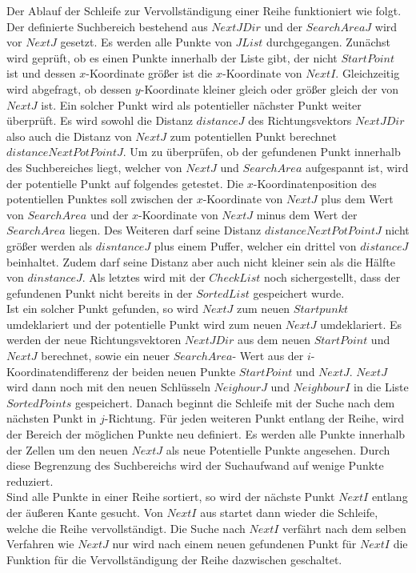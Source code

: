 Der Ablauf der Schleife zur Vervollständigung einer Reihe funktioniert wie folgt. Der definierte Suchbereich bestehend aus $NextJDir$ und der $SearchAreaJ$ wird vor $NextJ$ gesetzt. Es werden alle Punkte von $JList$ durchgegangen. Zunächst wird geprüft, ob es einen Punkte innerhalb der Liste gibt, der nicht $StartPoint$ ist und dessen $x$-Koordinate größer ist die $x$-Koordinate von $NextI$. Gleichzeitig wird abgefragt, ob dessen $y$-Koordinate kleiner gleich oder größer gleich der von $NextJ$ ist. Ein solcher Punkt wird als potentieller nächster Punkt weiter überprüft. Es wird sowohl die Distanz $distanceJ$ des Richtungsvektors $NextJDir$ also auch die Distanz von $NextJ$ zum potentiellen Punkt berechnet $distanceNextPotPointJ$. Um zu überprüfen, ob der gefundenen Punkt innerhalb des Suchbereiches liegt, welcher von $NextJ$ und $SearchArea$ aufgespannt ist, wird der potentielle Punkt auf folgendes getestet. Die $x$-Koordinatenposition des potentiellen Punktes soll zwischen der $x$-Koordinate von $NextJ$ plus dem Wert von $SearchArea$ und der $x$-Koordinate von $NextJ$ minus dem Wert der $SearchArea$ liegen. Des Weiteren darf seine Distanz $distanceNextPotPointJ$ nicht größer werden als $disntanceJ$ plus einem Puffer, welcher ein drittel von $distanceJ$ beinhaltet. Zudem darf seine Distanz aber auch nicht kleiner sein als die Hälfte von $dinstanceJ$. Als letztes wird mit der $CheckList$ noch sichergestellt, dass der gefundenen Punkt nicht bereits in der $SortedList$ gespeichert wurde.\\

Ist ein solcher Punkt gefunden, so wird $NextJ$ zum neuen $Startpunkt$ umdeklariert und der potentielle Punkt wird zum neuen $NextJ$ umdeklariert. Es werden der neue Richtungsvektoren $NextJDir$ aus dem neuen $StartPoint$ und $NextJ$ berechnet, sowie ein neuer $SearchArea$- Wert aus der $i$-Koordinatendifferenz der beiden neuen Punkte $StartPoint$ und $NextJ$. $NextJ$ wird dann noch mit den neuen Schlüsseln $NeighourJ$ und $NeighbourI$ in die Liste $SortedPoints$ gespeichert. Danach beginnt die Schleife mit der Suche nach dem nächsten Punkt in $j$-Richtung. Für jeden weiteren Punkt entlang der Reihe, wird der Bereich der möglichen Punkte neu definiert. Es werden alle Punkte innerhalb der Zellen um den neuen $NextJ$ als neue Potentielle Punkte angesehen. Durch diese Begrenzung des Suchbereichs wird der Suchaufwand auf wenige Punkte reduziert. \\

Sind alle Punkte in einer Reihe sortiert, so wird der nächste Punkt $NextI$ entlang der äußeren Kante gesucht. Von $NextI$ aus startet dann wieder die Schleife, welche die Reihe vervollständigt. Die Suche nach $NextI$ verfährt nach dem selben Verfahren wie $NextJ$ nur wird nach einem neuen gefundenen Punkt für $NextI$ die Funktion für die Vervollständigung der Reihe dazwischen geschaltet.\\
%

